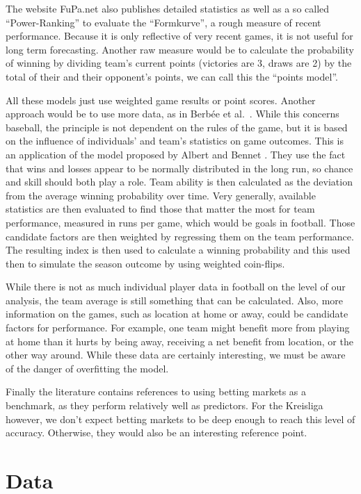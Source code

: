 \documentclass[12pt,a4paper]{article}
\begin{document}
The website FuPa.net \autocite*{fupa} also publishes detailed statistics
as well as a so called \enquote{Power-Ranking} to evaluate the
\enquote{Formkurve}, a rough measure of recent performance. Because it
is only reflective of very recent games, it is not useful for long term
forecasting. Another raw measure would be to calculate the probability
of winning by dividing team's current points (victories are 3, draws are
2) by the total of their and their opponent's points, we can call this
the \enquote{points model}.

All these models just use weighted game results or point scores. Another
approach would be to use more data, as in Berbée et
al.~\autocite*{baseball}. While this concerns baseball, the principle is
not dependent on the rules of the game, but it is based on the influence
of individuals' and team's statistics on game outcomes. This is an
application of the model proposed by Albert and Bennet
\autocite*{bennet2007}. They use the fact that wins and losses appear to
be normally distributed in the long run, so chance and skill should both
play a role. Team ability is then calculated as the deviation from the
average winning probability over time. Very generally, available
statistics are then evaluated to find those that matter the most for
team performance, measured in runs per game, which would be goals in
football. Those candidate factors are then weighted by regressing them
on the team performance. The resulting index is then used to calculate a
winning probability and this used then to simulate the season outcome by
using weighted coin-flips.

While there is not as much individual player data in football on the
level of our analysis, the team average is still something that can be
calculated. Also, more information on the games, such as location at
home or away, could be candidate factors for performance. For example,
one team might benefit more from playing at home than it hurts by being
away, receiving a net benefit from location, or the other way around.
While these data are certainly interesting, we must be aware of the
danger of overfitting the model.

Finally the literature contains references to using betting markets as a
benchmark, as they perform relatively well as predictors. For the
Kreisliga however, we don't expect betting markets to be deep enough to
reach this level of accuracy. Otherwise, they would also be an
interesting reference point.

\hypertarget{data}{%
\section{Data}\label{data}}
\end{document}
